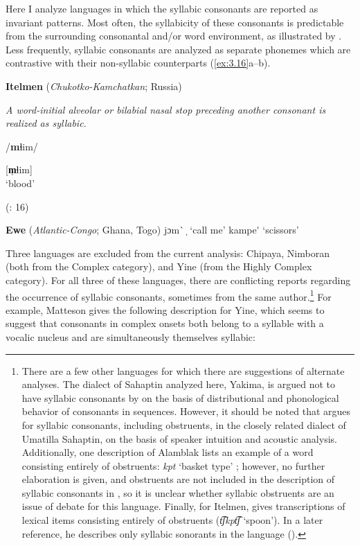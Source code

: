   Here I analyze languages in which the syllabic consonants are reported as invariant patterns. Most often, the syllabicity of these consonants is predictable from the surrounding consonantal and/or word environment, as illustrated by . Less frequently, syllabic consonants are analyzed as separate phonemes which are contrastive with their non-syllabic counterparts (\ref{ex:3.16}a--b).

\ea\label{ex:3.15}
  \textbf{Itelmen} (\textit{Chukotko-Kamchatkan}; Russia)

\textit{A word-initial alveolar or bilabial nasal stop preceding another consonant is realized as syllabic.}

/\textbf{m}ɬim/

[\textbf{m̩}ɬim]\\
\glt ‘blood’

(\citealt{GeorgVolodin1999}: 16)
\z

\ea\label{ex:3.16}
  \textbf{Ewe} (\textit{Atlantic-Congo}; Ghana, Togo)
\ea   jɔm\`{} ̩
\glt  ‘call me’
\ex kampe\'{} 
\glt  ‘scissors’
\citep[38]{Ameka1991}
\z
\z

  Three languages are excluded from the current analysis: Chipaya, Nimboran (both from the Complex category), and Yine (from the Highly Complex category). For all three of these languages, there are conflicting reports regarding the occurrence of syllabic consonants, sometimes from the same author.\footnote{{There are a few other languages for which there are suggestions of alternate analyses. The dialect of Sahaptin analyzed here, Yakima, is argued not to have syllabic consonants by \citet{HargusBeavert2006} on the basis of distributional and phonological behavior of consonants in sequences. However, it should be noted that \citet{Minthorn2005} argues for syllabic consonants, including obstruents, in the closely related dialect of Umatilla Sahaptin, on the basis of speaker intuition and acoustic analysis. Additionally, one description of Alamblak lists an example of a word consisting entirely of obstruents:} \textrm{\textit{kpt}} \textrm{‘basket type’ \citep[1]{EdmistonEdmiston2003}; however, no further elaboration is given, and obstruents are not included in the description of syllabic consonants in \citet{Bruce1984}, so it is unclear whether syllabic obstruents are an issue of debate for this language. Finally, for Itelmen, \citet[42]{Volodin1976} gives transcriptions of lexical items consisting entirely of obstruents (}\textrm{\textit{t͡ʃkpt͡ʃ} }\textrm{‘spoon’). In a later reference, he describes only syllabic sonorants in the language (\citealt{GeorgVolodin1999}).}} For example, Matteson gives the following description for Yine, which seems to suggest that consonants in complex onsets both belong to a syllable with a vocalic nucleus and are simultaneously themselves syllabic:

